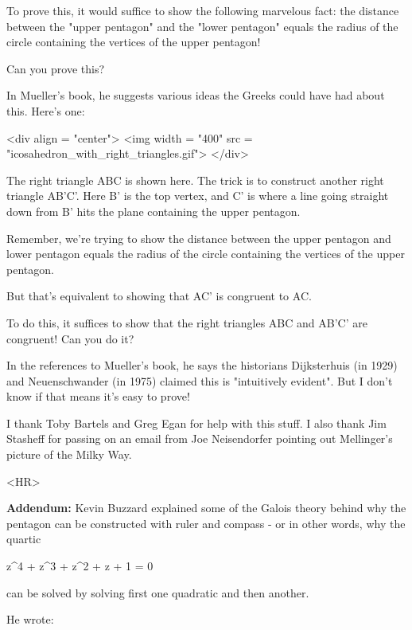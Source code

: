 To prove this, it would suffice to show the following marvelous fact:
the distance between the "upper pentagon" and the
"lower pentagon" equals the radius of the circle containing
the vertices of the upper pentagon!

Can you prove this?

In Mueller's book, he suggests various ideas the Greeks could
have had about this.  Here's one:

<div align = "center">
<img width = "400" src = "icosahedron_with_right_triangles.gif">
</div>

The right triangle ABC is shown here.  The trick is to construct
another right triangle AB'C'.  Here B' is the top vertex, and C'
is where a line going straight down from B' hits the plane
containing the upper pentagon.

Remember, we're trying to show the distance 
between the upper pentagon and lower pentagon 
equals the radius of the circle containing the
vertices of the upper pentagon.

But that's equivalent to showing that AC' is congruent to AC.

To do this, it suffices to show that the right triangles ABC
and AB'C' are congruent!  Can you do it?

In the references to Mueller's book, he says the historians
Dijksterhuis (in 1929) and Neuenschwander (in 1975) claimed this
is "intuitively evident".  But I don't know if that means
it's easy to prove!

I thank Toby Bartels and Greg Egan for help with this stuff.
I also thank Jim Stasheff for passing on an email from Joe
Neisendorfer pointing out Mellinger's picture of the Milky Way.

<HR>

\textbf{Addendum:} Kevin Buzzard explained some of the Galois theory
behind why the pentagon can be constructed with ruler and compass -
or in other words, why the quartic 

z^{4} + z^{3} + z^{2} + z + 1 = 0

can be solved by solving first one quadratic and then another.

He wrote:



